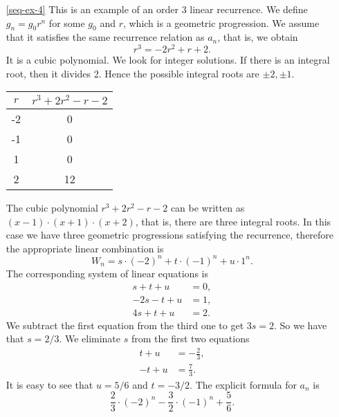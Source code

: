 \begin{enumerate}
\item[\ref{seq-ex-4}]
This is an example of an order 3 linear recurrence. We define $g_n=g_0r^n$ for some $g_0$ and $r$, which is a geometric
progression. We assume that it satisfies the same recurrence relation as $a_n$, that is, we obtain
$$
r^3=-2r^2+r+2.
$$
It is a cubic polynomial. We look for integer solutions. If there is an integral root, then it divides 2. Hence the possible integral roots
are $\pm 2,\pm 1$.
\begin{center}
\begin{tabular}{|c|c|}
\hline
$r$ & $r^3+2r^2-r-2$\\
\hline
-2 & 0\\
\hline
-1 & 0\\
\hline
1 & 0\\
\hline
2 & 12\\
\hline
\end{tabular}
\end{center}
The cubic polynomial $r^3+2r^2-r-2$ can be written as $\left(x-1\right) \cdot \left(x+1\right) \cdot \left(x+2\right)$, that is, there are three integral roots.
In this case we have three geometric progressions satisfying the recurrence, therefore the appropriate linear combination
is
$$
W_n=s\cdot (-2)^n+t\cdot (-1)^n+u\cdot 1^n.
$$
The corresponding system of linear equations is
\begin{align*}
s+t+u&=0,\\
-2s-t+u&=1,\\
4s+t+u&=2.
\end{align*}
We subtract the first equation from the third one to get $3s=2$. So we have that $s=2/3$.
We eliminate $s$ from the first two equations
\begin{align*}
t+u&=-\frac{2}{3},\\
-t+u&=\frac{7}{3}.
\end{align*}
It is easy to see that $u=5/6$ and $t=-3/2$.
The explicit formula for $a_n$ is 
\[
\frac23 \cdot (-2)^n-\frac32\cdot (-1)^n+\frac56. 
\]


\end{enumerate}
